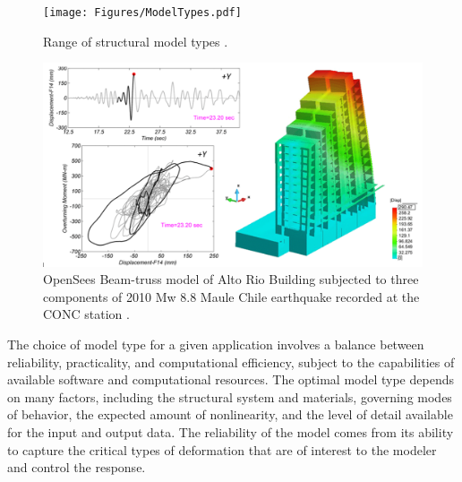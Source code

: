 \begin{figure}[htb]
    \centering
    \texttt{[image: Figures/ModelTypes.pdf]}
    \caption{Range of structural model types \citep{deierlein2010nonlinear}.}
    \label{fig:response_ModelTypes}
\end{figure}

\begin{figure}[htb]
    \centering
    \includegraphics[width=1.0\textwidth, angle = 0]{Figures/Alto_Rio_bldg.pdf}
    \caption{OpenSees Beam-truss model of Alto Rio Building subjected to three components of 2010 Mw 8.8 Maule Chile earthquake recorded at the CONC station \citep{zhang2017nonlinear}.}
    \label{fig:response_AltoRio}
\end{figure}

The choice of model type for a given application involves a balance between reliability, practicality, and computational efficiency, subject to the capabilities of available software and computational resources. The optimal model type depends on many factors, including the structural system and materials, governing modes of behavior, the expected amount of nonlinearity, and the level of detail available for the input and output data. The reliability of the model comes from its ability to capture the critical types of deformation that are of interest to the modeler and control the response. 

